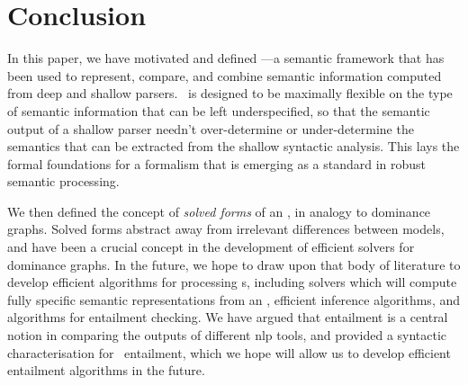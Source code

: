 \section{Conclusion}
\label{sec:conclusion}

In this paper, we have motivated and defined \rmrs---a semantic
framework that has been used to represent, compare, and combine
semantic information computed from deep and shallow parsers.  \rmrs\
is designed to be maximally flexible on the type of semantic
information that can be left underspecified, so that
the semantic output of a shallow parser needn't over-determine or
under-determine the semantics that can be extracted from
the shallow syntactic analysis.  This lays the formal foundations for
a formalism that is emerging as a standard in
robust semantic processing.

We then defined the concept of \emph{solved forms} of an \rmrs, in
analogy to dominance graphs.  Solved forms abstract away from
irrelevant differences between models, and have been a crucial concept
in the development of efficient solvers for dominance graphs.  In the
future, we hope to draw upon that body of literature to develop
efficient algorithms for processing \rmrs s, including solvers which
will compute fully specific semantic representations from an \rmrs,
efficient inference algorithms, and algorithms for entailment
checking.  We have argued that entailment is a central notion in
comparing the outputs of different {\sc nlp} tools, and provided a syntactic
characterisation for \rmrs\ entailment, which we hope will allow us to
develop efficient entailment algorithms in the future.


